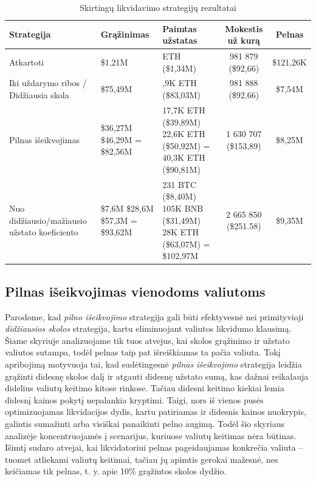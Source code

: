 \documentclass[]{VUMIFTemplateClass}
\begin{document}
\begin{table}[h!]
  \centering
  \caption{Skirtingų likvidavimo strategijų rezultatai}
  \begin{tabular}{|>{\raggedright\arraybackslash}m{3.5cm}|>{\centering\arraybackslash}p{2cm}|>{\centering\arraybackslash}p{4cm}|c|c|}
  \hline
  \textbf{Strategija} & \textbf{Grąžinimas} & \textbf{Paimtas užstatas} & \textbf{Mokestis už kurą} & \textbf{Pelnas} \\ \hline
  Atkartoti                                    & \$1,21M   & 594 ETH (\$1,34M)     & 981 879 (\$92,66)    & \$121,26K \\ \hline
  Iki uždarymo ribos / Didžiausia skola        & \$75,49M & 36,9K ETH (\$83,03M) & 981 888 (\$92,66)    & \$7,54M   \\ \hline
  Pilnas išeikvojimas                & \makecell[c]{\$36,27M \\ \$46,29M \\ = \$82,56M}  & \makecell[c]{17,7K ETH (\$39,89M) \\ 22,6K ETH (\$50,92M) \\ = 40,3K ETH (\$90,81M)}  & 1 630 707 (\$153,89) & \$8,25M   \\ \hline
  Nuo didžiausio/mažiausio užstato koeficiento & \makecell[c]{\$7,6M \\ \$28,6M \\ \$57,3M \\ = \$93,62M}  &  \makecell[c]{231 BTC (\$8,40M) \\ 105K BNB (\$31,49M) \\ 28K ETH (\$63,07M) \\ = \$102,97M}    & 2 665 850 (\$251.58)   & \$9,35M   \\ \hline
  \end{tabular}
  \label{liquidation_example_comp}
  \end{table}

\subsection{Pilnas išeikvojimas vienodoms valiutoms}
Parodome, kad \textit{pilno išeikvojimo} strategija gali būti efektyvesnė nei primityvioji \textit{didžiausios skolos} strategija, kartu eliminuojant valiutos likvidumo klausimą. Šiame skyriuje analizuojame tik tuos atvejus, kai skolos grąžinimo ir užstato valiutos sutampa, todėl pelnas taip pat išreiškiamas ta pačia valiuta. Tokį apribojimą motyvuoja tai, kad sudėtingesnė \textit{pilnas išeikvojimo} strategija leidžia grąžinti didesnę skolos dalį ir atgauti didesnę užstato sumą, kas dažnai reikalauja didelius valiutų keitimo kitose rinkose. Tačiau didesni keitimo kiekiai lemia didesnį kainos pokytį nepalankia kryptimi. Taigi, nors iš vienos pusės optimizuojamas likvidacijos dydis, kartu patiriamas ir didesnis kainos nuokrypis, galintis sumažinti arba visiškai panaikinti pelno augimą. Todėl šio skyriaus analizėje koncentruojamės į scenarijus, kuriuose valiutų keitimas nėra būtinas. Išimtį sudaro atvejai, kai likvidatoriui pelnas pageidaujamas konkrečia valiuta – tuomet atliekami valiutų keitimai, tačiau jų apimtis gerokai mažesnė, nes keičiamas tik pelnas, t. y. apie 10\% grąžintos skolos dydžio.
\end{document}
